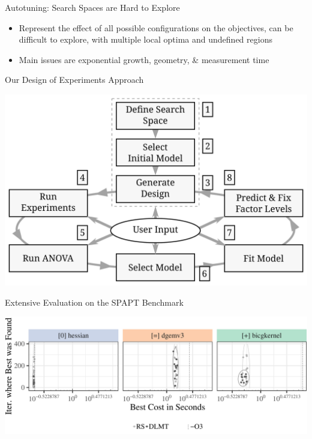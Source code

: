 \documentclass[11pt, compress, aspectratio=169, xcolor={table,usenames,dvipsnames}]{beamer}
\begin{document}
\begin{frame}
\begin{columns}
\begin{column}{0.89\columnwidth}
\begin{columns}
\begin{column}[t]{0.48\columnwidth}
\begin{block}{Autotuning: Search Spaces are Hard to Explore}
\begin{itemize}
\item Represent the \alert{effect} of all possible
\alert{configurations} on the \alert{objectives}, can be difficult to explore,
with multiple \alert{local optima} and \alert{undefined regions}
\item \alert{Main issues} are \alert{exponential growth}, \alert{geometry}, \& \alert{measurement time}
\end{itemize}
\end{block}

\begin{block}{Our Design of Experiments Approach}
\begin{center}
\begin{center}
\includegraphics[width=0.5\columnwidth]{../../../img/doe_anova_strategy.pdf}
\end{center}
\end{center}
\end{block}
\begin{block}{Extensive Evaluation on the SPAPT Benchmark}
\begin{center}
\begin{center}
\includegraphics[width=0.9\columnwidth]{../../../img/iteration_best_comparison.pdf}
\end{center}
\end{center}


\end{block}
\end{column}
\end{columns}
\end{column}
\end{columns}
\end{frame}
\end{document}
